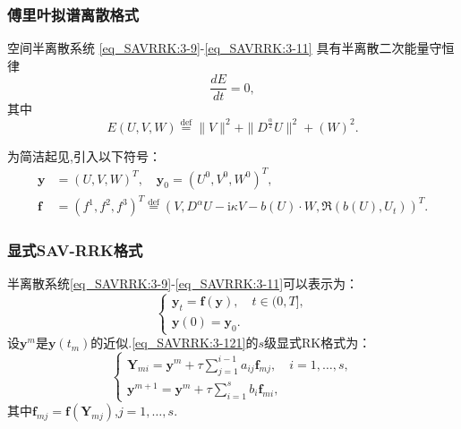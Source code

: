 \documentclass[aspectratio=169]{beamer}
\numberwithin{theorem}{section} %
\begin{document}
\begin{frame}\frametitle{傅里叶拟谱离散格式}

	\begin{theorem}	\label{thm3}
		空间半离散系统 \eqref{eq_SAVRRK:3-9}-\eqref{eq_SAVRRK:3-11} 具有半离散二次能量守恒律
		\begin{equation}
		\frac{dE}{dt}=0, \label{eq_SAVRRK:313a}
		\end{equation}
		其中
		\begin{equation}
		E(U,V,W)\overset{\text{def}}{=}\|V\|^2 + \|D^\frac{\alpha}{2} U\|^2+\left(W\right)^2.\label{eq_SAVRRK:313}
		\end{equation}
		\end{theorem}
		为简洁起见,引入以下符号：
		\begin{equation}
			\begin{aligned}
				\bm{y}&=\left(U,V,W\right)^T,\quad\bm{y}_0=\left(U^0,V^0,W^0\right)^T , \\
				\bm{f}&=(f^1,f^2,f^3)^T\overset{\text{def}}{=}(V,D^{\alpha} U-\mathrm{i}\kappa V-b(U)\cdot W,\Re\left(b(U), U_t\right))^T.
			\end{aligned}
		\end{equation}
	\end{frame}

\begin{frame}\frametitle{显式SAV-RRK格式}

半离散系统\eqref{eq_SAVRRK:3-9}-\eqref{eq_SAVRRK:3-11}可以表示为：
\begin{equation}
\left\{\begin{array}{l}
\bm{y}_t=\bm{f}(\bm{y}),\quad t \in(0, T],\\
\bm{y}(0)=\bm{y}_0.
\end{array}\right.\label{eq_SAVRRK:3-121}
\end{equation}
设$\bm{y}^m$是$\bm{y}\left(t_m\right)$的近似.\eqref{eq_SAVRRK:3-121}的$s$级显式RK格式\cite{hairerRungeKuttaMethods2015}为：
\begin{equation}
\left\{\begin{array}{l}
\bm{Y}_{m i}=\bm{y}^m+\tau \sum\limits_{j=1}^{i-1} a_{i j} \bm{f}_{m j}, \quad i=1, \ldots, s, \\
\bm{y}^{m+1}=\bm{y}^m+\tau \sum\limits_{i=1}^s b_i \bm{f}_{m i},
\end{array}\right.\label{eq_SAVRRK:4-31}
\end{equation}
其中$\bm{f}_{m j}=\bm{f}\left(\bm{Y}_{m j}\right)$,$j=1, \ldots, s$.
\end{frame}
\end{document}
